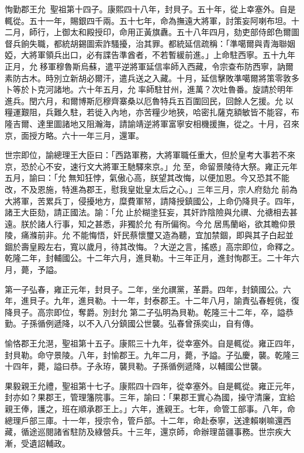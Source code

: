 \begin{pinyinscope}
恂勤郡王允，聖祖第十四子。康熙四十八年，封貝子。五十年，從上幸塞外。自是輒從。五十一年，賜銀四千兩。五十七年，命為撫遠大將軍，討策妄阿喇布坦。十二月，師行，上御太和殿授印，命用正黃旗纛。五十八年四月，劾吏部侍郎色爾圖督兵餉失職，都統胡錫圖索詐騷擾，治其罪。都統延信疏稱：「準噶爾與青海聯姻婭，大將軍領兵出口，必有諜告準酋者，不若暫緩前進。」上命駐西寧。五十九年正月，允移軍穆魯斯烏蘇，遣平逆將軍延信率師入西藏，令宗查布防西寧，訥爾素防古木。時別立新胡必爾汗，遣兵送之入藏。十月，延信擊敗準噶爾將策零敦多卜等於卜克河諸地。六十年五月，允率師駐甘州，進萬？次吐魯番。旋請於明年進兵。閏六月，和爾博斯厄穆齊寨桑以厄魯特兵五百圍回民，回餘人乞援。允以糧運艱阻，兵難久駐，若徙入內地，亦苦糧少地狹，哈密扎薩克額敏皆不能容，布隆吉爾、達里圖諸地又阻瀚海，請諭靖逆將軍富寧安相機援撫，從之。十月，召來京，面授方略。六十一年三月，還軍。

世宗即位，諭總理王大臣曰：「西路軍務，大將軍職任重大，但於皇考大事若不來京，恐於心不安，速行文大將軍王馳驛來京。」允至，命留景陵待大祭。雍正元年五月，諭曰：「允無知狂悖，氣傲心高，朕望其改悔，以便加恩。今又恐其不能改，不及恩施，特進為郡王，慰我皇妣皇太后之心。」三年三月，宗人府劾允前為大將軍，苦累兵丁，侵擾地方，糜費軍帑，請降授鎮國公，上命仍降貝子。四年，諸王大臣劾，請正國法。諭：「允止於糊塗狂妄，其奸詐陰險與允禩、允禟相去甚遠。朕於諸人行事，知之甚悉，非獨於允有所偏徇。今允居馬蘭峪，欲其瞻仰景陵，痛滌前非。允不能悔悟，奸民蔡懷璽又造為聽，宜加禁錮，即與其子白起並錮於壽皇殿左右，寬以歲月，待其改悔。？大逆之言，搖惑」高宗即位，命釋之。乾隆二年，封輔國公。十二年六月，進貝勒。十三年正月，進封恂郡王。二十年六月，薨，予謚。

第一子弘春，雍正元年，封貝子。二年，坐允禩黨，革爵。四年，封鎮國公。六年，進貝子。九年，進貝勒。十一年，封泰郡王。十二年八月，諭責弘春輕佻，復降貝子。高宗即位，奪爵。別封允第二子弘明為貝勒。乾隆三十二年，卒，謚恭勤。子孫循例遞降，以不入八分鎮國公世襲。弘春曾孫奕山，自有傳。

愉恪郡王允潖，聖祖第十五子。康熙三十九年，從幸塞外。自是輒從。雍正四年，封貝勒。命守景陵。八年，封愉郡王。九年二月，薨，予謚。子弘慶，襲。乾隆三十四年，薨，謚曰恭。子永珔，襲貝勒。子孫循例遞降，以輔國公世襲。

果毅親王允禮，聖祖第十七子。康熙四十四年，從幸塞外。自是輒從。雍正元年，封亦如？果郡王，管理籓院事。三年，諭曰：「果郡王實心為國，操守清廉，宜給親王俸，護之，班在順承郡王上。」六年，進親王。七年，命管工部事。八年，命總理戶部三庫。十一年，授宗令，管戶部。十二年，命赴泰寧，送達賴喇嘛還西藏，循途巡閱諸省駐防及綠營兵。十三年，還京師，命辦理苗疆事務。世宗疾大漸，受遺詔輔政。


\end{pinyinscope}
